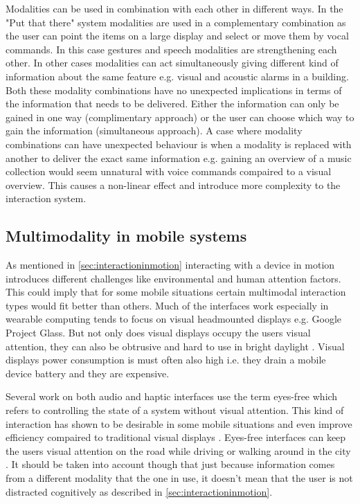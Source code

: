 Modalities can be used in combination with each other in different ways. In the "Put that there" system \cite{bolt_put-that-there:_1980} modalities are used in a complementary combination as the user can point the items on a large display and select or move them by vocal commands. In this case gestures and speech modalities are strengthening each other. In other cases modalities can act simultaneously giving different kind of information about the same feature e.g. visual and acoustic alarms in a building. Both these modality combinations have no unexpected implications in terms of the information that needs to be delivered. Either the information can only be gained in one way (complimentary approach) or the user can choose which way to gain the information (simultaneous approach). A case where modality combinations can have unexpected behaviour is when a modality is replaced with another to deliver the exact same information e.g. gaining an overview of a music collection would seem unnatural with voice commands compaired to a visual overview. This causes a non-linear effect and introduce more complexity to the interaction system.

\subsection{Multimodality in mobile systems}
As mentioned in \ref{sec:interactioninmotion} interacting with a device in motion introduces different challenges like environmental and human attention factors. This could imply that for some mobile situations certain multimodal interaction types would fit better than others. Much of the interfaces work especially in wearable computing tends to focus on visual headmounted displays \cite{barfield_fundamentals_2000} e.g. Google Project Glass. But not only does visual displays occupy the users visual attention, they can also be obtrusive and hard to use in bright daylight \cite{geelhoed_safety_2000}. Visual displays power consumption is must often also high i.e. they drain a mobile device battery and they are expensive.

Several work on both audio \cite{kajastila_eyes-free_2013,bonner_no-look_2010,brewster_multimodaleyes-freeinteraction_2003,zhao_earpod:_2007,vazquez-alvarez_eyes-free_2011} and haptic \cite{pasquero_haptic_2011,pielot_tactile_2011} interfaces use the term eyes-free which refers to controlling the state of a system without visual attention. This kind of interaction has shown to be desirable in some mobile situations \cite{oakley_designing_2007,yi_exploring_2012} and even improve efficiency compaired to traditional visual displays \cite{zhao_earpod:_2007}. Eyes-free interfaces can keep the users visual attention on the road while driving \cite{sodnik_user_2008} or walking around in the city \cite{vazquez-alvarez_eyes-free_2011}. It should be taken into account though that just because information comes from a different modality that the one in use, it doesn't mean that the user is not distracted cognitively as described in \ref{sec:interactioninmotion}.


